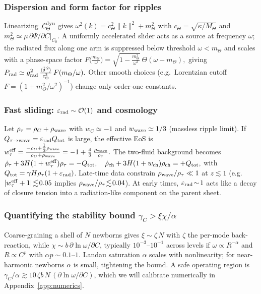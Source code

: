 \documentclass[11pt]{article}
\begin{document}
\subsubsection{Dispersion and form factor for ripples}\label{subsub:radiative-form}
Linearizing $\mathcal L_\Theta^{\rm dyn}$ gives $\omega^2(k)=c_\Theta^2\|k\|^2+m_\Theta^2$ with $c_\Theta=\sqrt{\kappa/M_\Theta}$ and $m_\Theta^2\simeq \mu\,\partial\Psi/\partial C|_{C_0}$.
A uniformly accelerated slider acts as a source at frequency $\omega$; the radiated flux along one arm is suppressed below threshold $\omega<m_\Theta$ and scales with a phase-space factor
\(
F\!\big(\tfrac{m_\Theta}{\omega}\big)=\sqrt{1-\tfrac{m_\Theta^2}{\omega^2}}\ \Theta(\omega-m_\Theta),
\)
giving
\(
P_{\rm rad}\simeq g_{\rm rad}^2\,\frac{\langle \ddot\delta^{\,2}\rangle}{c_\Theta^3}\,F(m_\Theta/\omega).
\)
Other smooth choices (e.g.\ Lorentzian cutoff $F=(1+m_\Theta^2/\omega^2)^{-1}$) change only order-one constants.

\subsubsection{Fast sliding: $\varepsilon_{\rm rad}\sim \mathcal O(1)$ and cosmology}\label{subsub:fast-sliding}
Let $\rho_\tau=\rho_C+\rho_{\rm wave}$ with $w_C\simeq -1$ and $w_{\rm wave}\simeq 1/3$ (massless ripple limit).
If $Q_{\tau\to{\rm wave}}=\varepsilon_{\rm rad} Q_{\rm tot}$ is large, the effective EoS is
\(
w_\tau^{\rm eff} = \frac{-\rho_C + \tfrac13 \rho_{\rm wave}}{\rho_C+\rho_{\rm wave}}
= -1 + \frac{4}{3}\,\frac{\rho_{\rm wave}}{\rho_\tau}.
\)
The two-fluid background becomes
\(
\dot\rho_\tau + 3H(1+w_\tau^{\rm eff})\rho_\tau = -Q_{\rm tot},\quad
\dot\rho_{\rm ch} + 3H(1+w_{\rm ch})\rho_{\rm ch} = +Q_{\rm tot},
\)
with $Q_{\rm tot}=\gamma H \rho_\tau(1+\varepsilon_{\rm rad})$.
Late-time data constrain $\rho_{\rm wave}/\rho_\tau \ll 1$ at $z\!\lesssim\!1$ (e.g.\ $|w_\tau^{\rm eff}+1|\!\lesssim\!0.05$ implies $\rho_{\rm wave}/\rho_\tau\!\lesssim\!0.04$).
At early times, $\varepsilon_{\rm rad}\!\sim\!1$ acts like a decay of closure tension into a radiation-like component on the parent sheet.

\subsubsection{Quantifying the stability bound $\gamma_C > \xi\chi/\alpha$}\label{subsub:stability-numbers}
Coarse-graining a shell of $N$ newborns gives $\xi\sim \zeta\,N$ with $\zeta$ the per-mode back-reaction, while $\chi\sim b\,\partial\ln\omega/\partial C$, typically $10^{-3}$--$10^{-1}$ across levels if $\omega\!\propto\!R^{-\alpha}$ and $R\!\propto\!C^p$ with $\alpha p\!\sim\!0.1$--$1$.
Landau saturation $\alpha$ scales with nonlinearity; for near-harmonic newborns $\alpha$ is small, tightening the bound.
A safe operating region is $\gamma_C/\alpha \gtrsim 10\,\zeta b\,N\,(\partial\ln\omega/\partial C)$, which we will calibrate numerically in Appendix~\ref{app:numerics}.
\end{document}
